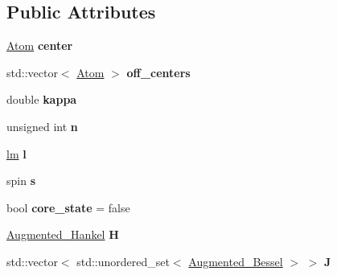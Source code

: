 \subsection*{Public Attributes}
\begin{DoxyCompactItemize}
\item 
\mbox{\label{classAugmented__spherical__wave_aecd09481e9003d76036f7592149b1d27}} 
\hyperlink{classAtom}{Atom} {\bfseries center}
\item 
\mbox{\label{classAugmented__spherical__wave_a5f9033a60373cacd172d142a87a694f4}} 
std\+::vector$<$ \hyperlink{classAtom}{Atom} $>$ {\bfseries off\+\_\+centers}
\item 
\mbox{\label{classAugmented__spherical__wave_a4ea71ee3db8c61d41f4df3326e56a72d}} 
double {\bfseries kappa}
\item 
\mbox{\label{classAugmented__spherical__wave_ae6adf9a476a6e1f7be2e21ca5afe7b5b}} 
unsigned int {\bfseries n}
\item 
\mbox{\label{classAugmented__spherical__wave_afe08877e95bfb68401e5a0f0529fb621}} 
\hyperlink{structlm}{lm} {\bfseries l}
\item 
\mbox{\label{classAugmented__spherical__wave_aa26003f4ae5783b2da539dabddef7da2}} 
spin {\bfseries s}
\item 
\mbox{\label{classAugmented__spherical__wave_af4fc69413960bb7e6b77ce16434c51b5}} 
bool {\bfseries core\+\_\+state} = false
\item 
\mbox{\label{classAugmented__spherical__wave_a624a1c8999b66228527d3453014dee3c}} 
\hyperlink{classAugmented__Hankel}{Augmented\+\_\+\+Hankel} {\bfseries H}
\item 
\mbox{\label{classAugmented__spherical__wave_abd9ef377a44070f9e9a1296531f92c2e}} 
std\+::vector$<$ std\+::unordered\+\_\+set$<$ \hyperlink{classAugmented__Bessel}{Augmented\+\_\+\+Bessel} $>$ $>$ {\bfseries J}
\end{DoxyCompactItemize}


